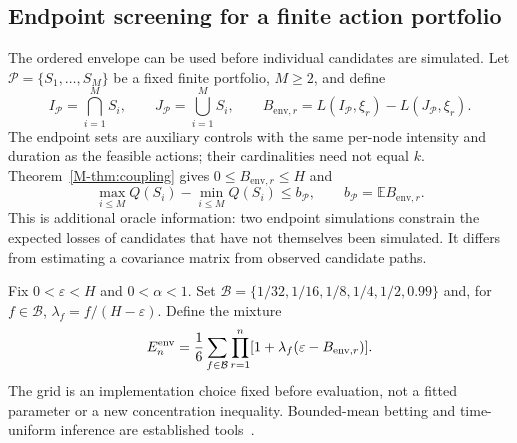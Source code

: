 \documentclass[preprint,11pt,sort&compress]{elsarticle}
\newcommand{\E}{\mathbb E}
\begin{document}
\subsection{Endpoint screening for a finite action portfolio}
\label{sec:endpoint_selection}
The ordered envelope can be used before individual candidates are simulated.
Let $\mathcal P=\{S_1,\ldots,S_M\}$ be a fixed finite portfolio, $M\ge2$, and define
\[
 I_{\mathcal P}=\bigcap_{i=1}^M S_i,\qquad
 J_{\mathcal P}=\bigcup_{i=1}^M S_i,\qquad
 B_{\mathrm{env},r}=L(I_{\mathcal P},\xi_r)-L(J_{\mathcal P},\xi_r).
\]
The endpoint sets are auxiliary controls with the same per-node intensity and
duration as the feasible actions; their cardinalities need not equal $k$.
Theorem~\ref{M-thm:coupling} gives $0\le B_{\mathrm{env},r}\le H$ and
\begin{equation}
 \max_{i\le M}Q(S_i)-\min_{i\le M}Q(S_i)\le b_{\mathcal P},
 \qquad b_{\mathcal P}=\E B_{\mathrm{env},r}.
 \label{eq:portfolio_diameter}
\end{equation}
This is additional oracle information: two endpoint simulations constrain
the expected losses of candidates that have not themselves been simulated.
It differs from estimating a covariance matrix from observed candidate paths.

Fix $0<\varepsilon<H$ and $0<\alpha<1$. Set
$\mathcal B=\{1/32,1/16,1/8,1/4,1/2,0.99\}$ and, for $f\in\mathcal B$,
$\lambda_f=f/(H-\varepsilon)$. Define the mixture
\begin{equation}
 E_n^{\rm env}=\frac1{6}\sum_{f\in\mathcal B}
       \prod_{r=1}^n[1+\lambda_f(\varepsilon-B_{\mathrm{env},r})].
 \label{eq:envelope_bet}
\end{equation}
The grid is an implementation choice fixed before evaluation, not a fitted
parameter or a new concentration inequality. Bounded-mean betting and
time-uniform inference are established tools~\cite{howard2021,waudby2024}.
\end{document}
